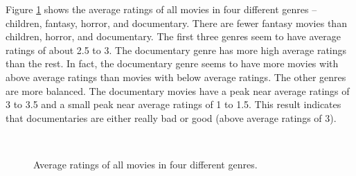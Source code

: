 Figure \ref{fig:average-3-genres} shows the average ratings of all movies in four different genres -- children, fantasy, horror, and documentary. There are fewer fantasy movies than children, horror, and documentary. The first three genres seem to have average ratings of about 2.5 to 3. The documentary genre has more high average ratings than the rest. In fact, the documentary genre seems to have more movies with above average ratings than movies with below average ratings. The other genres are more balanced. The documentary movies have a peak near average ratings of 3 to 3.5 and a small peak near average ratings of 1 to 1.5. This result indicates that documentaries are either really bad or good (above average ratings of 3).


\begin{figure}[H]
	\centering
	\\
	\caption{Average ratings of all movies in four different genres.} \label{fig:average-3-genres}
\end{figure}
